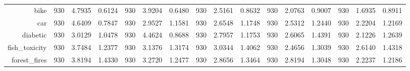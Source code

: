 \begin{table}[htbp]
{\begin{tabular}{rccccccccccccccc}
                  bike                                & 930                                      & 4.7935                                                                    & 0.6124          & 930                            & 3.9204          & 0.6480          & 930                             & 2.5161          & 0.8632          & 930                             & 2.0763                                                                    & 0.9007          & 930                             & \cellcolor[rgb]{ .776,  .937,  .808}\textcolor[rgb]{ 0,  .38,  0}{1.6935}          & 0.8911          \\
                  car                                 & 930                                      & 4.6409                                                                    & 0.7847          & 930                            & 2.9527          & 1.1581          & 930                             & 2.6548          & 1.1748          & 930                             & 2.5312                                                                    & 1.2440          & 930                             & \cellcolor[rgb]{ .776,  .937,  .808}\textcolor[rgb]{ 0,  .38,  0}{2.2204}          & 1.2169          \\
                  diabetic                            & 930                                      & 3.0129                                                                    & 1.0478          & 930                            & 4.4624          & 0.8688          & 930                             & 2.7957          & 1.1753          & 930                             & 2.6065                                                                    & 1.4391          & 930                             & \cellcolor[rgb]{ .776,  .937,  .808}\textcolor[rgb]{ 0,  .38,  0}{2.1226}          & 1.2639          \\
                  fish\_toxicity                      & 930                                      & 3.7484                                                                    & 1.2377          & 930                            & 3.1376          & 1.3174          & 930                             & 3.0344          & 1.4062          & 930                             & \cellcolor[rgb]{ .776,  .937,  .808}\textcolor[rgb]{ 0,  .38,  0}{2.4656} & 1.3039          & 930                             & 2.6140                                                                             & 1.4318          \\
                  forest\_fires                       & 930                                      & 3.8194                                                                    & 1.4330          & 930                            & 3.2720          & 1.2477          & 930                             & 2.8656          & 1.3464          & 930                             & 2.8194                                                                    & 1.3048          & 930                             & \cellcolor[rgb]{ .776,  .937,  .808}\textcolor[rgb]{ 0,  .38,  0}{2.2237}          & 1.2186          \\

\end{tabular}}
\end{table}
